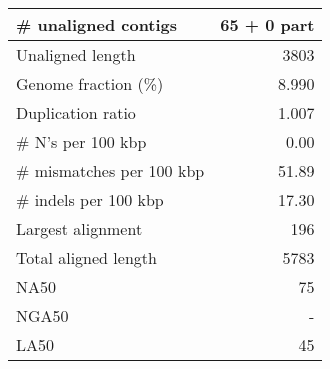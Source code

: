 \documentclass[12pt,a4paper]{article}
\begin{document}
\begin{table}[ht]
\begin{center}
\begin{tabular}{|l*{1}{|r}|}
\# unaligned contigs & 65 + 0 part \\ \hline
Unaligned length & 3803 \\ \hline
Genome fraction (\%) & 8.990 \\ \hline
Duplication ratio & 1.007 \\ \hline
\# N's per 100 kbp & 0.00 \\ \hline
\# mismatches per 100 kbp & 51.89 \\ \hline
\# indels per 100 kbp & 17.30 \\ \hline
Largest alignment & 196 \\ \hline
Total aligned length & 5783 \\ \hline
NA50 & 75 \\ \hline
NGA50 & - \\ \hline
LA50 & 45 \\ \hline
\end{tabular}
\end{center}
\end{table}
\end{document}
